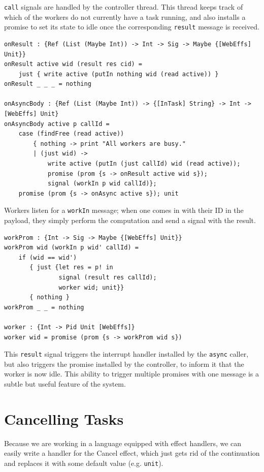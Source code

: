 \documentclass[msc,deptreport,cs]{infthesis} %
\newcommand{\code}[1]{\lstinline{#1}}
\begin{document}
\code{call} signals are handled by the controller thread. This thread keeps
track of which of the workers do not currently have a task running, and
also installs a promise to set its state to idle once the corresponding
\code{result} message is received.

\begin{lstlisting}
onResult : {Ref (List (Maybe Int)) -> Int -> Sig -> Maybe {[WebEffs] Unit}}
onResult active wid (result res cid) =
    just { write active (putIn nothing wid (read active)) }
onResult _ _ _ = nothing

onAsyncBody : {Ref (List (Maybe Int)) -> {[InTask] String} -> Int -> [WebEffs] Unit}
onAsyncBody active p callId =
    case (findFree (read active))
        { nothing -> print "All workers are busy."
        | (just wid) ->
            write active (putIn (just callId) wid (read active));
            promise (prom {s -> onResult active wid s});
            signal (workIn p wid callId)};
    promise (prom {s -> onAsync active s}); unit
\end{lstlisting}

Workers listen for a \code{workIn} message; when one comes in with their ID in
the payload, they simply perform the computation and send a signal with the
result.

\begin{lstlisting}
workProm : {Int -> Sig -> Maybe {[WebEffs] Unit}}
workProm wid (workIn p wid' callId) =
    if (wid == wid')
       { just {let res = p! in
               signal (result res callId);
               worker wid; unit}}
       { nothing }
workProm _ _ = nothing

worker : {Int -> Pid Unit [WebEffs]}
worker wid = promise (prom {s -> workProm wid s})
\end{lstlisting}

This \code{result} signal triggers the interrupt handler installed by the
\code{async} caller, but also triggers the promise installed by the controller,
to inform it that the worker is now idle. This ability to trigger multiple
promises with one message is a subtle but useful feature of the system.


\section{Cancelling Tasks}

Because we are working in a language equipped with effect handlers, we can
easily write a handler for the \textsf{Cancel} effect, which just gets rid of
the continuation and replaces it with some default value (e.g. \code{unit}).
\end{document}
